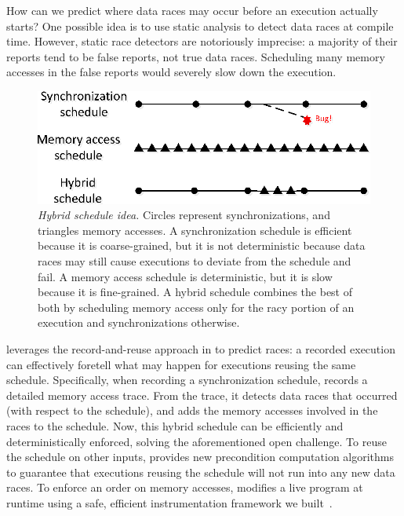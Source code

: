 How can we predict where data races may occur before an execution actually
starts?  One possible idea is to use static analysis to detect data races
at compile time.
However, static race detectors are notoriously imprecise: a majority of
their reports tend to be false reports, not true data races.  Scheduling
many memory accesses in the false reports would severely slow down the
execution.

\begin{figure}[t]
\includegraphics[width=\linewidth]{peregrine/figures/hybrid-schedule}
\vspace{-.3in}
\caption{{\em Hybrid schedule idea.} Circles represent synchronizations,
  and triangles memory accesses.  A synchronization schedule is efficient
  because it is coarse-grained, but it is not deterministic because data
  races may still cause executions to deviate from the schedule and
  fail.  A memory access schedule is
  deterministic, but it is slow because it is fine-grained.  A hybrid
  schedule combines the best of both by scheduling memory access only for
  the racy portion of an execution and synchronizations
  otherwise.} \label{fig:hybrid-schedule}
\end{figure}


\peregrine leverages the record-and-reuse approach in \tern to predict races:
a recorded execution can effectively foretell what may happen for
executions reusing the same schedule.  Specifically, when recording a
synchronization schedule, \peregrine records a detailed memory access trace.
From the trace, it detects data races that occurred (with respect to the
schedule), and adds the memory accesses involved in the races to the
schedule.  Now, this hybrid schedule can be efficiently and
deterministically enforced, solving the aforementioned open challenge.
To reuse the schedule on other inputs, \peregrine provides new precondition
computation algorithms to guarantee that executions reusing the schedule
will not run into any new data races. To enforce an order on memory
accesses, \peregrine modifies a live program at runtime using
a safe, efficient instrumentation framework we built~\cite{wu:loom:osdi10}.

